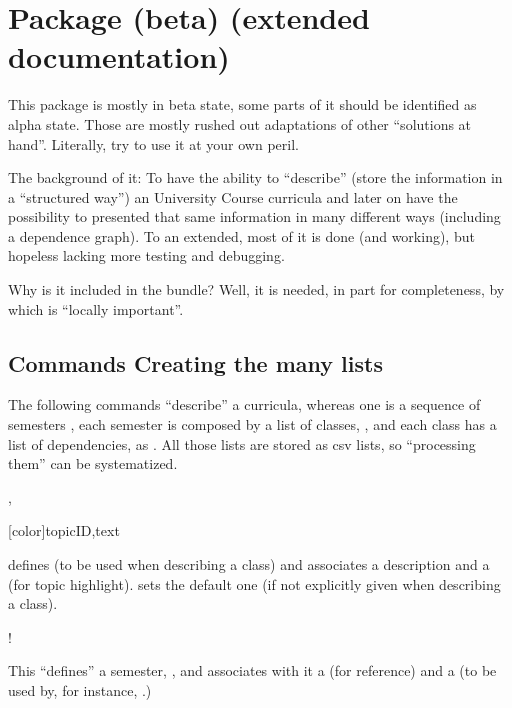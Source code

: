 \documentclass[dctools,english,tocdepth=3,secdepth=3]{ufrgscca} %
\begin{document}
\section{ Package (beta) (extended documentation)}
This package is mostly in beta state, some parts of it should be identified as  alpha state. Those are mostly rushed out adaptations of other “solutions at hand”. Literally, try to use it at your own peril.

The background of it: To have the ability to “describe” (store the information in a “structured way”) an University Course curricula and later on have the possibility to presented that same information in many different ways (including a dependence graph). To an extended, most of it is done (and working), but hopeless lacking more testing and debugging.

Why is it included in the bundle? Well, it is needed, in part for completeness, by  which is “locally important”.

\subsection{Commands Creating the many lists}
The following commands “describe” a curricula, whereas one is a sequence of semesters , each semester is composed by a list of classes, , and each class has a list of dependencies,  as \Macro{\depdef}{}. All those lists are stored as csv lists, so “processing them” can be systematized.

\begin{Macros}{\topicdef,}
\begin{Syntax}%
    \Macro{\topicdef}[color]{topicID,text}
\end{Syntax}
\Macro{\topicdef}{} defines  (to be used when describing a class) and associates a  description and a  (for topic highlight).  sets the default one (if not explicitly given when describing a class).
\end{Macros}


\begin{Macros}{\semdef}
    \begin{Syntax}%
        \Macro!{\semdef}{}
    \end{Syntax}
This “defines” a semester, , and associates with it a  (for reference) and a  (to be used by, for instance, .)
\end{Macros}
\end{document}

